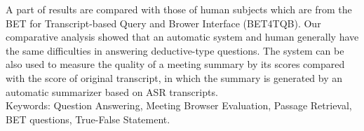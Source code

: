 
A part of results are compared with those of human subjects which are from the BET for Transcript-based Query and Brower Interface (BET4TQB)\cite{popescubelis2008tot}. Our comparative analysis showed that an automatic system and human generally have the same difficulties in answering deductive-type questions. The system can be also used to measure the quality of a meeting summary by its scores compared with the score of original transcript, in which the summary is generated by an automatic summarizer based on ASR transcripts. \\

Keywords: Question Answering, Meeting Browser Evaluation, Passage Retrieval, BET questions, True-False Statement.


